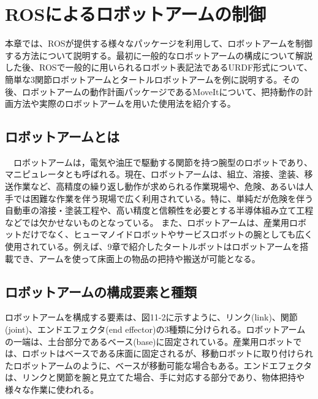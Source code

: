 
\chapter{ROSによるロボットアームの制御}

本章では、ROSが提供する様々なパッケージを利用して、ロボットアームを制御する方法について説明する。最初に一般的なロボットアームの構成について解説した後、ROSで一般的に用いられるロボット表記法であるURDF形式について、簡単な3関節ロボットアームとタートルロボットアームを例に説明する。その後、ロボットアームの動作計画パッケージであるMoveItについて、把持動作の計画方法や実際のロボットアームを用いた使用法を紹介する。

\section{ロボットアームとは}

　ロボットアームは，電気や油圧で駆動する関節を持つ腕型のロボットであり、マニピュレータとも呼ばれる。現在、ロボットアームは、組立、溶接、塗装、移送作業など、高精度の繰り返し動作が求められる作業現場や、危険、あるいは人手では困難な作業を伴う現場で広く利用されている。特に、単純だが危険を伴う自動車の溶接・塗装工程や、高い精度と信頼性を必要とする半導体組み立て工程などでは欠かせないものとなっている。
また、ロボットアームは、産業用ロボットだけでなく、ヒューマノイドロボットやサービスロボットの腕としても広く使用されている。例えば、9章で紹介したタートルボットはロボットアームを搭載でき、アームを使って床面上の物品の把持や搬送が可能となる。

\section{ロボットアームの構成要素と種類}

ロボットアームを構成する要素は、図11-2に示すように、リンク(link)、関節(joint)、エンドエフェクタ(end effector)の3種類に分けられる。ロボットアームの一端は、土台部分であるベース(base)に固定されている。産業用ロボットでは、ロボットはベースである床面に固定されるが、移動ロボットに取り付けられたロボットアームのように、ベースが移動可能な場合もある。エンドエフェクタは、リンクと関節を腕と見立てた場合、手に対応する部分であり、物体把持や様々な作業に使われる。


